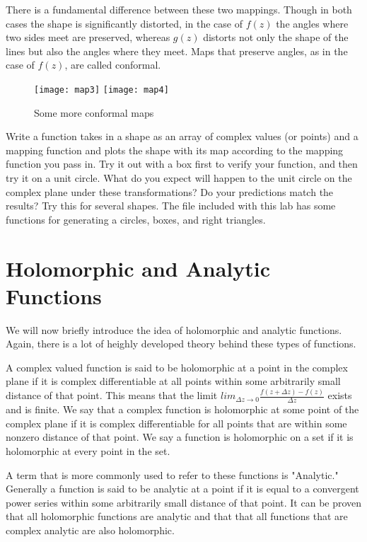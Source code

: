 There is a fundamental difference between these two mappings.  Though in both cases the shape is significantly distorted, in the case of $f(z)$ the angles where two sides meet are preserved, whereas $g(z)$ distorts not only the shape of the lines but also the angles where they meet.  Maps that preserve angles, as in the case of $f(z)$, are called conformal.

\begin{figure}
\begin{center}
\texttt{[image: map3]}
\texttt{[image: map4]}
\caption{Some more conformal maps}
\end{center}
\end{figure}

\begin{problem}
Write a function takes in a shape as an array of complex values (or points) and a mapping function and plots the shape with its map according to the mapping function you pass in. Try it out with a box first to verify your function, and then try it on a unit circle. What do you expect will happen to the unit circle on the complex plane under these transformations?  Do your predictions match the results?  Try this for several shapes. The file included with this lab  has some functions for generating a circles, boxes, and right triangles.
\end{problem}

\section*{Holomorphic and Analytic Functions}

We will now briefly introduce the idea of holomorphic and analytic functions. Again, there is a lot of heighly developed theory behind these types of functions.

A complex valued function is said to be holomorphic at a point in the complex plane if it is complex differentiable at all points within some arbitrarily small distance of that point. This means that the limit $lim_{\Delta z \to 0} \frac{f(z+\Delta z)-f(z)}{\Delta z}$ exists and is finite. We say that a complex function is holomorphic at some point of the complex plane if it is complex differentiable for all points that are within some nonzero distance of that point. We say a function is holomorphic on a set if it is holomorphic at every point in the set.

A term that is more commonly used to refer to these functions is "Analytic." Generally a function is said to be analytic at a point if it is equal to a convergent power series within some arbitrarily small distance of that point. It can be proven that all holomorphic functions are analytic and that that all functions that are complex analytic are also holomorphic.

